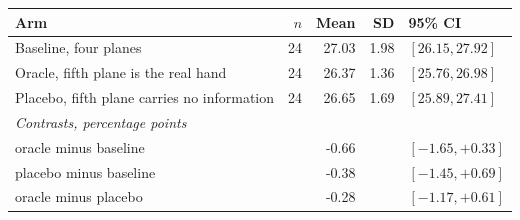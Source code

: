 \begin{tabular}{l r r r l}
\toprule
Arm & $n$ & Mean & SD & 95\% CI \\
\midrule
Baseline, four planes & 24 & 27.03 & 1.98 & $[26.15, 27.92]$ \\
Oracle, fifth plane is the real hand & 24 & 26.37 & 1.36 & $[25.76, 26.98]$ \\
Placebo, fifth plane carries no information & 24 & 26.65 & 1.69 & $[25.89, 27.41]$ \\
\midrule
\multicolumn{5}{l}{\emph{Contrasts, percentage points}} \\
oracle minus baseline & & -0.66 & & $[-1.65, +0.33]$ \\
placebo minus baseline & & -0.38 & & $[-1.45, +0.69]$ \\
oracle minus placebo & & -0.28 & & $[-1.17, +0.61]$ \\
\bottomrule
\end{tabular}
